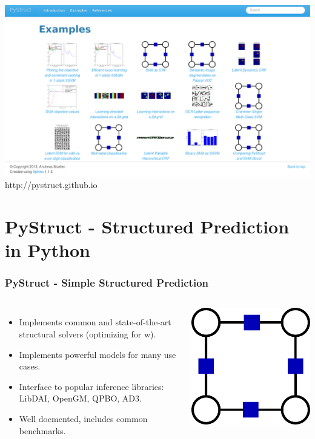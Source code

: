 \documentclass[final,ignorenonframetext,compress]{beamer}
\begin{document}
    \begin{frame}
        \begin{center}
            \includegraphics[width=\linewidth]{images/example_gallery}\\
            http://pystruct.github.io
        \end{center}
    \end{frame}


\section{PyStruct - Structured Prediction in Python}
\begin{frame}
    \frametitle{PyStruct - Simple Structured Prediction}
    \begin{columns}
            \begin{itemize}
                \item Implements common and state-of-the-art structural solvers (optimizing for w).
                \item<2-> Implements powerful models for many use cases.
                \item<3-> Interface to popular inference libraries: LibDAI, OpenGM, QPBO, AD3.
                \item<4-> Well docmented, includes common benchmarks.
            \end{itemize}
        \begin{center}
            \includegraphics[width=.6\linewidth]{images/logo_pystruct}
        \end{center}
    \end{columns}
\end{frame}
\end{document}
